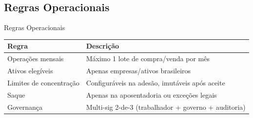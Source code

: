 \documentclass{libs/ufc_format}
\begin{document}
\subsection{Regras Operacionais}
\begin{frame}{Regras Operacionais}
    \begin{table}
        \centering
        \small
        \begin{tabular}{p{3.5cm}p{6cm}}
            \hline
            \textbf{Regra} & \textbf{Descrição} \\
            \hline
            Operações mensais & Máximo 1 lote de compra/venda por mês \\
            Ativos elegíveis & Apenas empresas/ativos brasileiros \\
            Limites de concentração & Configuráveis na adesão, imutáveis após aceite \\
            Saque & Apenas na aposentadoria ou exceções legais \\
            Governança & Multi-sig 2-de-3 (trabalhador + governo + auditoria) \\
            \hline
        \end{tabular}
    \end{table}
    
    \vspace{0.3cm}
    
\end{frame}
\end{document}
